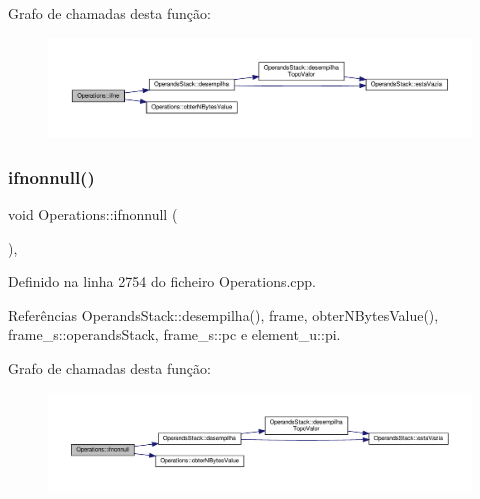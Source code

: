Grafo de chamadas desta função\+:\nopagebreak
\begin{figure}[H]
\begin{center}
\leavevmode
\includegraphics[width=350pt]{classOperations_aaadc2a6aaf1d3be06e918930622dad29_cgraph}
\end{center}
\end{figure}
\mbox{\label{classOperations_a00af7ab198690f5d3e6c7f2b2d374194}} 
\subsubsection{\texorpdfstring{ifnonnull()}{ifnonnull()}}
{\footnotesize\ttfamily void Operations\+::ifnonnull (\begin{DoxyParamCaption}{ }\end{DoxyParamCaption})\hspace{0.3cm}{\ttfamily [static]}, {\ttfamily [private]}}



Definido na linha 2754 do ficheiro Operations.\+cpp.



Referências Operands\+Stack\+::desempilha(), frame, obter\+N\+Bytes\+Value(), frame\+\_\+s\+::operands\+Stack, frame\+\_\+s\+::pc e element\+\_\+u\+::pi.

Grafo de chamadas desta função\+:\nopagebreak
\begin{figure}[H]
\begin{center}
\leavevmode
\includegraphics[width=350pt]{classOperations_a00af7ab198690f5d3e6c7f2b2d374194_cgraph}
\end{center}
\end{figure}
\mbox{\label{classOperations_a030f5995f8f357254e543d0cbce2d189}} 
